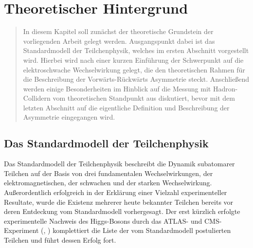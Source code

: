 


\chapter{Theoretischer Hintergrund}

\begin{quote}
    In diesem Kapitel soll zunächst der theoretische Grundstein der
    vorliegenden Arbeit gelegt werden. Ausgangspunkt dabei ist das
    Standardmodell der Teilchenphysik, welches im ersten Abschnitt vorgestellt
    wird. Hierbei wird nach einer kurzen Einführung der Schwerpunkt auf die
    elektroschwache Wechselwirkung gelegt, die den theoretischen Rahmen für die
    Beschreibung der Vorwärts-Rückwärts Asymmetrie steckt. Anschließend werden
    einige Besonderheiten im Hinblick auf die Messung mit Hadron-Collidern
    vom theoretischen Standpunkt aus diskutiert, bevor mit dem letzten
    Abschnitt auf die eigentliche Definition und Beschreibung der Asymmetrie
    eingegangen wird.
\end{quote}



\section{Das Standardmodell der Teilchenphysik}
\label{theory:standardmodell}


Das Standardmodell der Teilchenphysik beschreibt die Dynamik subatomarer
Teilchen auf der Basis von drei fundamentalen Wechselwirkungen, der
elektromagnetischen, der schwachen und der starken Wechselwirkung.
Außerordentlich erfolgreich in der Erklärung einer Vielzahl experimenteller
Resultate, wurde die Existenz mehrerer heute bekannter Teilchen bereits vor
deren Entdeckung vom Standardmodell vorhergesagt. Der erst kürzlich erfolgte
experimentelle Nachweis des Higgs-Bosons durch das ATLAS- und CMS-Experiment
(\cite{Aad:2012tfa}, \cite{Chatrchyan:2013lba}) komplettiert die Liste der vom
Standardmodell postulierten Teilchen und führt dessen Erfolg fort.


